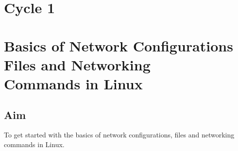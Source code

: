 
\section*{Cycle 1}

\section{\Large{Basics of Network Configurations Files and Networking \\Commands in Linux}}

\subsection{Aim}
\large To get started with the basics of network configurations, files and networking
commands in Linux.

